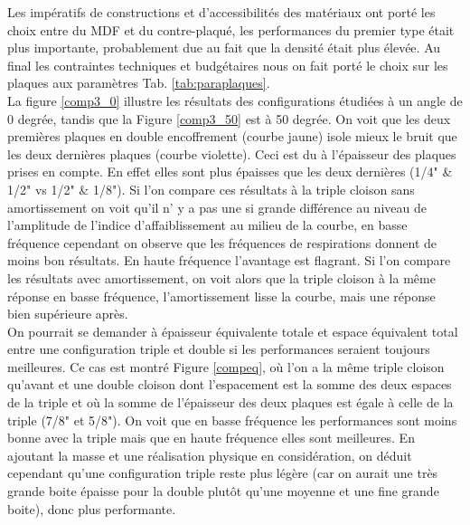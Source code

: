 \documentclass[12pt,foolscap]{report}
\begin{document}
	Les impératifs de constructions et d'accessibilités des matériaux ont porté les choix entre du MDF et du contre-plaqué, les performances du premier type était plus importante, probablement due au fait que la densité était plus élevée. Au final les contraintes techniques et budgétaires nous on fait porté le choix sur les plaques aux paramètres Tab. \ref{tab:paraplaques}.\\
	La figure \ref{comp3_0} illustre les résultats des configurations étudiées à un angle de 0 degrée, tandis que la Figure \ref{comp3_50} est à 50 degrée. On voit que les deux premières plaques en double encoffrement (courbe jaune) isole mieux le bruit que les deux dernières plaques (courbe violette). Ceci est du à l'épaisseur des plaques prises en compte. En effet elles sont plus épaisses que les deux dernières (1/4" \& 1/2" vs 1/2" \& 1/8"). Si l'on compare ces résultats à la triple cloison sans amortissement  on voit qu'il n' y a pas une si grande différence au niveau de l'amplitude de l'indice d'affaiblissement au milieu de la courbe, en basse fréquence cependant on observe que les fréquences de respirations donnent de moins bon résultats. En haute fréquence l'avantage est flagrant. Si l'on compare les résultats avec amortissement, on voit alors que la triple cloison à la même réponse en basse fréquence, l'amortissement lisse la courbe, mais une réponse bien supérieure après.\\
	On pourrait se demander à épaisseur équivalente totale et espace équivalent total entre une configuration triple et double si les performances seraient toujours meilleures. Ce cas est montré Figure \ref{compeq}, où l'on a la même triple cloison qu'avant et une double cloison dont l'espacement est la somme des deux espaces de la triple et où la somme de l'épaisseur des deux plaques est égale à celle de la triple (7/8" et 5/8"). On voit que en basse fréquence les performances sont moins bonne avec la triple mais que en haute fréquence elles sont meilleures. En ajoutant la masse et une réalisation physique en considération, on déduit cependant qu'une configuration triple reste plus légère (car on aurait une très grande boite épaisse pour la double plutôt qu'une moyenne et une fine grande boite), donc plus performante.\\ \\
	
\end{document}
